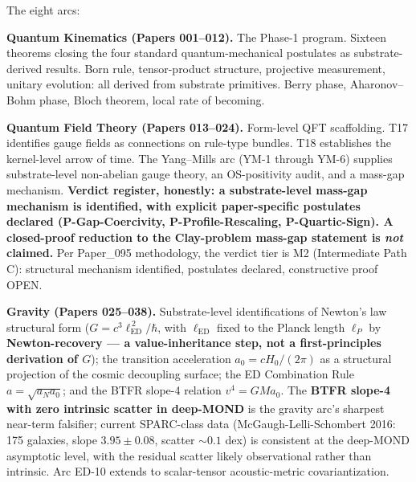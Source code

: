 \documentclass[11pt,a4paper]{article}
\begin{document}
The eight arcs:

\textbf{Quantum Kinematics (Papers 001--012).} The Phase-1 program. Sixteen theorems closing the four standard quantum-mechanical postulates as substrate-derived results. Born rule, tensor-product structure, projective measurement, unitary evolution: all derived from substrate primitives. Berry phase, Aharonov--Bohm phase, Bloch theorem, local rate of becoming.

\textbf{Quantum Field Theory (Papers 013--024).} Form-level QFT scaffolding. T17 identifies gauge fields as connections on rule-type bundles. T18 establishes the kernel-level arrow of time. The Yang--Mills arc (YM-1 through YM-6) supplies substrate-level non-abelian gauge theory, an OS-positivity audit, and a mass-gap mechanism. \textbf{Verdict register, honestly: a substrate-level mass-gap mechanism is identified, with explicit paper-specific postulates declared (P-Gap-Coercivity, P-Profile-Rescaling, P-Quartic-Sign). A closed-proof reduction to the Clay-problem mass-gap statement is \emph{not} claimed.} Per Paper\_095 methodology, the verdict tier is M2 (Intermediate Path C): structural mechanism identified, postulates declared, constructive proof OPEN.

\textbf{Gravity (Papers 025--038).} Substrate-level identifications of Newton's law structural form ($G = c^3 \ell_\mathrm{ED}^{\,2} / \hbar$, with $\ell_\mathrm{ED}$ fixed to the Planck length $\ell_P$ by \textbf{Newton-recovery --- a value-inheritance step, not a first-principles derivation of $G$}); the transition acceleration $a_0 = c H_0 / (2\pi)$ as a structural projection of the cosmic decoupling surface; the ED Combination Rule $a = \sqrt{a_N a_0}$; and the BTFR slope-4 relation $v^4 = G M a_0$. The \textbf{BTFR slope-4 with zero intrinsic scatter in deep-MOND} is the gravity arc's sharpest near-term falsifier; current SPARC-class data (McGaugh-Lelli-Schombert 2016: 175 galaxies, slope $3.95 \pm 0.08$, scatter $\sim 0.1$ dex) is consistent at the deep-MOND asymptotic level, with the residual scatter likely observational rather than intrinsic. Arc ED-10 extends to scalar-tensor acoustic-metric covariantization.
\end{document}
